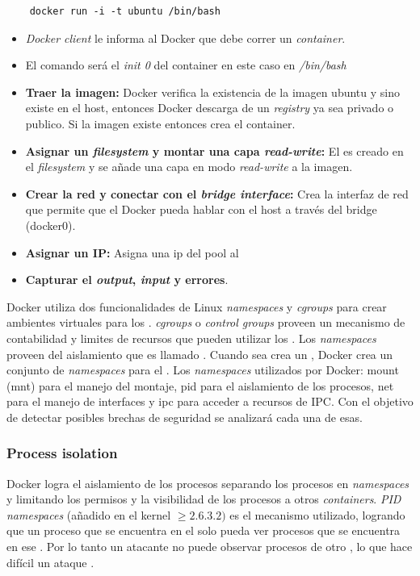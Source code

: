 \documentclass[letter,10pt]{article}
\begin{document}
\begin{verbatim}
	docker run -i -t ubuntu /bin/bash
\end{verbatim}
	\begin{itemize}
		\item \emph{Docker client} le informa al Docker que debe correr un \emph{container}.
		\item El comando será el \textit{init 0} del container en este caso en \emph{/bin/bash}
		\item \textbf{Traer la imagen:} Docker verifica la existencia de la imagen ubuntu y sino existe en el host, entonces Docker descarga de un \textit{registry} ya sea privado o publico. Si la imagen existe entonces crea el container.
		\item \textbf{Asignar un \emph{filesystem} y montar una capa \emph{read-write}:} El 
			\container es creado en el \emph{filesystem} y se añade una capa en modo 
			\emph{read-write} a la imagen.
		\item \textbf{Crear la red y conectar con el \emph{bridge interface}:} Crea la interfaz de red que permite que el Docker \container pueda hablar con el host a través del bridge (docker0).
		\item \textbf{Asignar un IP:} Asigna una ip del pool al \container
		\item \textbf{Capturar el \emph{output}, \emph{input} y errores}.
	\end{itemize}

Docker utiliza dos funcionalidades de Linux \emph{namespaces} y \emph{cgroups} para crear ambientes virtuales para los \containers. \emph{cgroups} o \emph{control groups} proveen un mecanismo de contabilidad y limites de recursos que pueden utilizar los \containers. \cite{bui2015analysis} Los \emph{namespaces} proveen del aislamiento que es llamado \container. Cuando sea crea un \container, Docker crea un conjunto de \emph{namespaces} para el \container. Los \emph{namespaces} utilizados por Docker: mount (mnt) para el manejo del montaje, pid para el aislamiento de los procesos, net para el manejo de interfaces y ipc para acceder a recursos de IPC. 
	Con el objetivo de detectar posibles brechas de seguridad se analizará cada una de esas.
	
	
	\subsubsection{Process isolation}
	
	Docker logra el aislamiento de los procesos separando los procesos en \emph{namespaces} y limitando los permisos y la visibilidad de los procesos a otros \emph{containers}. \emph{PID namespaces} (añadido en el kernel \( \geq 2.6.3.2)\) es el mecanismo utilizado, logrando que un proceso que se encuentra en el \container solo pueda ver procesos que se encuentra en ese \container. Por lo tanto un atacante no puede observar procesos de otro \container, lo que hace difícil un ataque \cite{bui2015analysis} \cite{LVM:2015:Online}.
	
\end{document}
